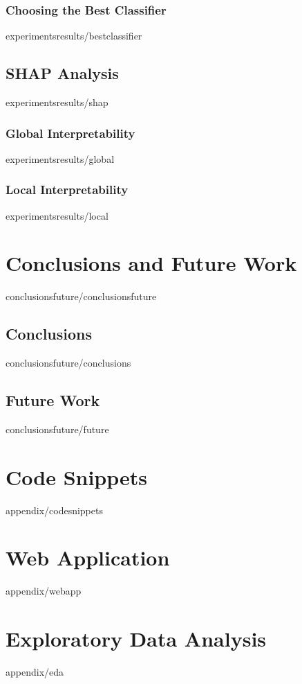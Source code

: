 \documentclass[covers, firstnumbered, tfg, extendedindex, epsbased, english, final]{tfgtfmthesisuam}
\begin{document}
\subsection{Choosing the Best Classifier}{experimentsresults/bestclassifier}
\section{SHAP Analysis}{experimentsresults/shap}
\subsection{Global Interpretability}{experimentsresults/global}
\subsection{Local Interpretability}{experimentsresults/local}

\chapter{Conclusions and Future Work\label{CAP:CONCLUSIONS}}{conclusionsfuture/conclusionsfuture}
\section{Conclusions}{conclusionsfuture/conclusions}
\section{Future Work}{conclusionsfuture/future}


\appendix

\chapter{Code Snippets\label{APP:CODE}}{appendix/codesnippets}
\chapter{Web Application\label{APP:WEBAPP}}{appendix/webapp}
\chapter{Exploratory Data Analysis\label{APP:EDA}}{appendix/eda}
\end{document}

